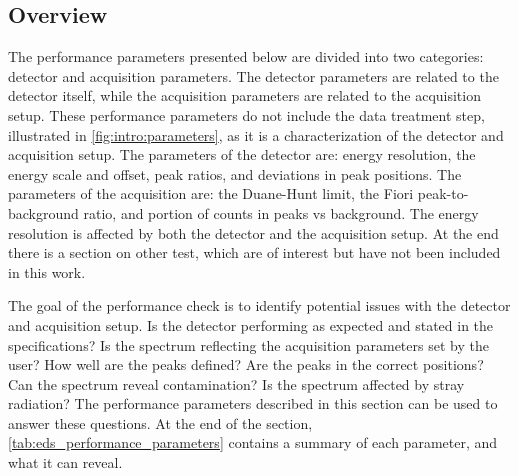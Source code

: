 \subsection{Overview}
\label{theory:eds_performance:overview}





The performance parameters presented below are divided into two categories: detector and acquisition parameters.
The detector parameters are related to the detector itself, while the acquisition parameters are related to the acquisition setup.
These performance parameters do not include the data treatment step, illustrated in \cref{fig:intro:parameters}, as it is a characterization of the detector and acquisition setup.
The parameters of the detector are: energy resolution, the energy scale and offset, peak ratios, and deviations in peak positions.
The parameters of the acquisition are: the Duane-Hunt limit, the Fiori peak-to-background ratio, and portion of counts in peaks vs background.
The energy resolution is affected by both the detector and the acquisition setup.
At the end there is a section on other test, which are of interest but have not been included in this work.


The goal of the performance check is to identify potential issues with the detector and acquisition setup.
Is the detector performing as expected and stated in the specifications?
Is the spectrum reflecting the acquisition parameters set by the user?
How well are the peaks defined?
Are the peaks in the correct positions?
Can the spectrum reveal contamination?
Is the spectrum affected by stray radiation?
The performance parameters described in this section can be used to answer these questions.
At the end of the section, \cref{tab:eds_performance_parameters} contains a summary of each parameter, and what it can reveal.



